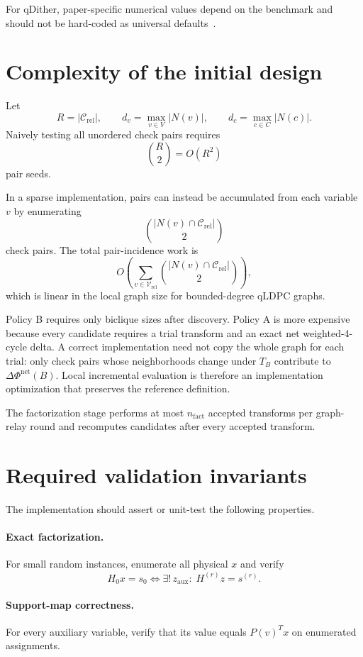 \documentclass[11pt,a4paper]{article}
\newcommand{\Crel}{\mathcal C_{\mathrm{rel}}}
\newcommand{\Vrel}{\mathcal V_{\mathrm{rel}}}
\begin{document}
For qDither, paper-specific numerical values depend on the benchmark and should
not be hard-coded as universal defaults~\cite{qdither}.

\section{Complexity of the initial design}

Let
\[
R=|\Crel|,
\qquad
d_v=\max_{v\in V}|N(v)|,
\qquad
d_c=\max_{c\in C}|N(c)|.
\]
Naively testing all unordered check pairs requires
\[
\binom R2=O(R^2)
\]
pair seeds.

In a sparse implementation, pairs can instead be accumulated from each
variable $v$ by enumerating
\[
\binom{|N(v)\cap\Crel|}{2}
\]
check pairs. The total pair-incidence work is
\[
O\!\left(
\sum_{v\in\Vrel}
\binom{|N(v)\cap\Crel|}{2}
\right),
\]
which is linear in the local graph size for bounded-degree qLDPC graphs.

Policy B requires only biclique sizes after discovery. Policy A is more
expensive because every candidate requires a trial transform and an exact net
weighted-4-cycle delta. A correct implementation need not copy the whole graph
for each trial: only check pairs whose neighborhoods change under $T_B$
contribute to $\Delta\Phi^{\mathrm{net}}(B)$. Local incremental evaluation is
therefore an implementation optimization that preserves the reference
definition.

The factorization stage performs at most $n_{\mathrm{fact}}$ accepted
transforms per graph-relay round and recomputes candidates after every accepted
transform.

\section{Required validation invariants}

The implementation should assert or unit-test the following properties.

\paragraph{Exact factorization.}
For small random instances, enumerate all physical $x$ and verify
\[
H_0x=s_0
\iff
\exists!\,z_{\mathrm{aux}}:\;H^{(r)}z=s^{(r)}.
\]

\paragraph{Support-map correctness.}
For every auxiliary variable, verify that its value equals $P(v)^Tx$ on
enumerated assignments.
\end{document}
